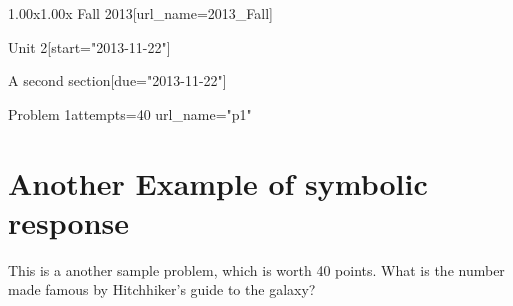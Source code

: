 \documentclass[12pt]{article}
\begin{document}
\begin{edXcourse}{1.00x}{1.00x Fall 2013}[url_name=2013_Fall]

\begin{edXchapter}{Unit 2}[start="2013-11-22"]

\begin{edXsection}{A second section}[due="2013-11-22"]

\begin{edXproblem}{Problem 1}{attempts=40 url_name="p1"}

\section{Another Example of symbolic response}  
 
This is a another sample problem, which is worth 40 points.  What is the number made famous by
Hitchhiker's guide to the galaxy?


\end{edXproblem}


\end{edXsection}
\end{edXchapter}
\end{edXcourse}

\end{document}
